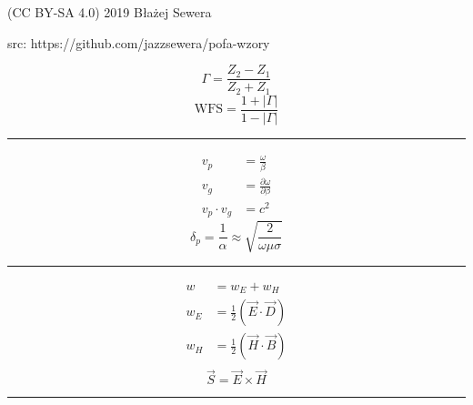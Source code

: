 \documentclass[12pt]{article}
\newenvironment{bottompar}{\par\vspace*{\fill}}{\clearpage}
\newcommand{\grayrule}{{\color{lightgray} \hrule}}
\begin{document}
\begin{bottompar}
    {\footnotesize \ttfamily (CC BY-SA 4.0) 2019 Błażej Sewera \par
    src: https://github.com/jazzsewera/pofa-wzory}
\end{bottompar}


\newpage

\begin{multicols}{3}

\begin{equation*}
    \Gamma = \frac{Z_2 - Z_1}{Z_2 + Z_1}
\end{equation*}
\begin{equation*}
    \mathrm{WFS} = \frac{1 + |\Gamma|}{1 - |\Gamma|}
\end{equation*}

\grayrule

\begin{equation*}
    \begin{split}
        v_p &= \frac{\omega}{\beta} \\
        v_g &= \frac{\partial \omega}{\partial \beta} \\
        v_p \cdot v_g &= c^2
    \end{split}
\end{equation*}
\begin{equation*}
    \delta_p = \frac{1}{\alpha} \approx \sqrt{\frac{2}{\omega \mu \sigma}}
\end{equation*}

\grayrule

\begin{equation*}
    \begin{split}
        w &= w_E + w_H \\
        w_E &= \frac{1}{2} \left(\Vec{E}\cdot\Vec{D}\right) \\
        w_H &= \frac{1}{2} \left(\Vec{H}\cdot\Vec{B}\right) \\
    \end{split}
\end{equation*}
\begin{equation*}
    \Vec{S} = \Vec{E} \times \Vec{H}
\end{equation*}

\grayrule


\end{multicols}
\end{document}
